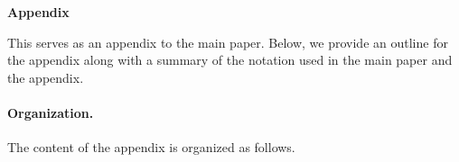 \documentclass{article}
\begin{document}
\appendix
{}


\renewcommand{\thesection}{\Alph{section}}
\setcounter{table}{0}
\renewcommand{\thetable}{\thesection\arabic{table}}
\setcounter{figure}{0} 
\renewcommand\thefigure{\thesection\arabic{figure}}
\setcounter{algorithm}{0}
\renewcommand{\thealgorithm}{\thesection.\arabic{algorithm}}
\renewcommand{\theHalgorithm}{\thesection.\arabic{algorithm}}


\begin{bibunit}[unsrtnat]

\begin{center}
\Large
{\bf Appendix}
\end{center}

This serves as an appendix to the main paper.
Below, we provide an outline for the appendix along with a summary of the notation used in the main paper and the appendix.

\paragraph{Organization.}
The content of the appendix is organized as follows.


\end{bibunit}
\end{document}
